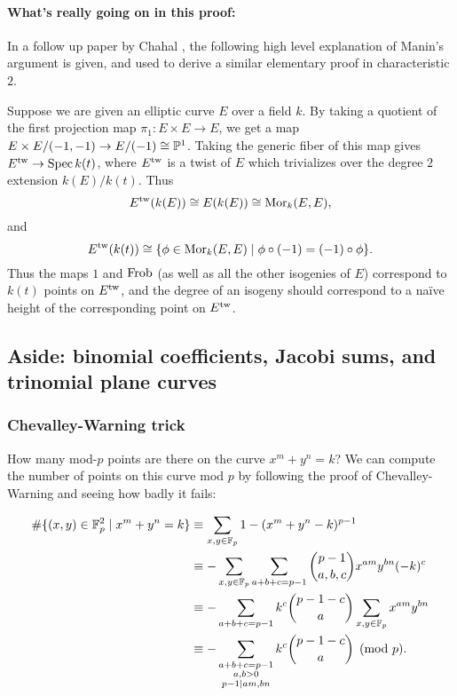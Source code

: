 \paragraph{What's really going on in this proof:} In a follow up paper by Chahal \cite{chahal-supplement}, the following high level explanation of Manin's argument is given, and used to derive a similar elementary proof in characteristic $2$.

Suppose we are given an elliptic curve $E$ over a field $k$. By taking a quotient of the first projection map $\pi_1: E\times E \rightarrow E$, we get a map $E\times E/(-1,-1) \rightarrow E/(-1) \cong \mathbb{P}^1$. Taking the generic fiber of this map gives $E^{\operatorname{tw}} \rightarrow \operatorname{Spec} k(t)$, where $E^{\operatorname{tw}}$ is a twist of $E$ which trivializes over the degree $2$ extension $k(E)/k(t)$. Thus
\[
E^{\operatorname{tw}}(k(E)) \cong E(k(E)) \cong \operatorname{Mor}_k(E,E),
\]
and
\[
E^{\operatorname{tw}}(k(t)) \cong \{\phi \in \operatorname{Mor}_k(E,E) \mid \phi\circ(-1) = (-1)\circ\phi\}.
\]
Thus the maps $1$ and $\operatorname{Frob}$ (as well as all the other isogenies of $E$) correspond to $k(t)$ points on $E^{\operatorname{tw}}$, and the degree of an isogeny should correspond to a na\"{i}ve height of the corresponding point on $E^{\operatorname{tw}}$.

\subsection{Aside: binomial coefficients, Jacobi sums, and trinomial plane curves}

\subsubsection{Chevalley-Warning trick}

How many mod-$p$ points are there on the curve $x^m + y^n = k$? We can compute the number of points on this curve mod $p$ by following the proof of Chevalley-Warning and seeing how badly it fails:

\begin{align*}
\#\{(x,y) \in \mathbb{F}_p^2\mid x^m + y^n = k\} &\equiv \sum_{x,y\in \mathbb{F}_p} 1 - (x^m + y^n - k)^{p-1}\\
&\equiv -\sum_{x,y\in\mathbb{F}_p}\sum_{a+b+c=p-1} \binom{p-1}{a,b,c}x^{am}y^{bn}(-k)^c\\
&\equiv -\sum_{a+b+c=p-1}k^c\binom{p-1-c}{a}\sum_{x,y\in\mathbb{F}_p}x^{am}y^{bn}\\
&\equiv -\sum_{\substack{a+b+c=p-1\\a,b>0\\p-1\mid am,bn}}k^c\binom{p-1-c}{a}\pmod{p}.
\end{align*}

